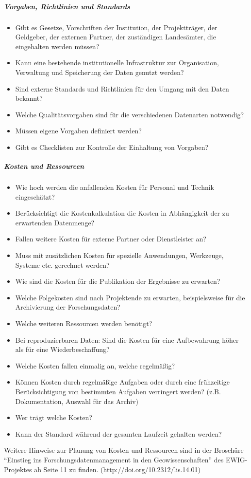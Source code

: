 \subparagraph{Vorgaben, Richtlinien und Standards}
\begin{itemize}
    \item Gibt es Gesetze, Vorschriften der Institution, der Projektträger, der Geldgeber, der externen Partner, der zuständigen Landesämter, die eingehalten werden müssen?
    \item Kann eine bestehende institutionelle Infrastruktur zur Organisation, Verwaltung und Speicherung der Daten genutzt werden?
    \item Sind externe Standards und Richtlinien für den Umgang mit den Daten bekannt?
    \item Welche Qualitätsvorgaben sind für die verschiedenen Datenarten notwendig?
    \item Müssen eigene Vorgaben definiert werden?
    \item Gibt es Checklisten zur Kontrolle der Einhaltung von Vorgaben?
\end{itemize}

\subparagraph{Kosten und Ressourcen}
\begin{itemize}
    \item Wie hoch werden die anfallenden Kosten für Personal und Technik eingeschätzt?
    \item Berücksichtigt die Kostenkalkulation die Kosten in Abhängigkeit der zu erwartenden Datenmenge?
    \item Fallen weitere Kosten für externe Partner oder Dienstleister an?
    \item Muss mit zusätzlichen Kosten für spezielle Anwendungen, Werkzeuge, Systeme etc. gerechnet werden?
    \item Wie sind die Kosten für die Publikation der Ergebnisse zu erwarten?
    \item Welche Folgekosten sind nach Projektende zu erwarten, beispielsweise für die Archivierung der Forschungsdaten?
    \item Welche weiteren Ressourcen werden benötigt?
    \item Bei reproduzierbaren Daten: Sind die Kosten für eine Aufbewahrung höher als für eine Wiederbeschaffung?
    \item Welche Kosten fallen einmalig an, welche regelmäßig?
    \item Können Kosten durch regelmäßige Aufgaben oder durch eine frühzeitige Berücksichtigung von bestimmten Aufgaben verringert werden? (z.B. Dokumentation, Auswahl für das Archiv)
    \item Wer trägt welche Kosten?
    \item Kann der Standard während der gesamten Laufzeit gehalten werden?
\end{itemize}
Weitere Hinweise zur Planung von Kosten und Ressourcen sind in der Broschüre “Einstieg ins Forschungsdatenmanagement in den Geowissenschaften” des EWIG-Projektes ab Seite 11 zu finden. (http://doi.org/10.2312/lis.14.01)


